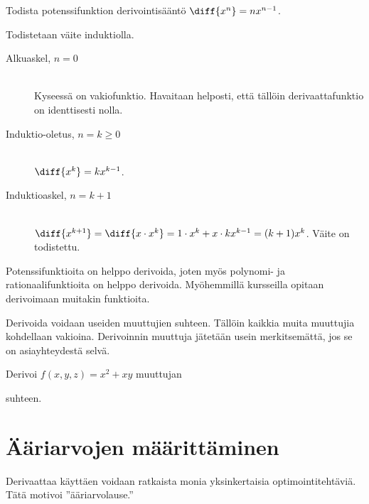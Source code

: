 \begin{esimerkki}
	Todista potenssifunktion derivointisääntö $\diff{x^n} = nx^{n-1}$.
	\begin{esimratk}
		Todistetaan väite induktiolla.
		\begin{description}
			\item[Alkuaskel, $n=0$] \hfill \\
			Kyseessä on vakiofunktio. Havaitaan helposti, että tällöin derivaattafunktio on identtisesti nolla.
			\item[Induktio-oletus, $n=k\geq0$] \hfill \\
			$\diff{x^k} = kx^{k-1}$.
			\item[Induktioaskel, $n=k+1$] \hfill \\
			$\diff{x^{k+1}} = \diff{x \cdot x^k} = 1 \cdot x^k + x \cdot kx^{k-1} = (k+1)x^k$. Väite on todistettu.
		\end{description}
	\end{esimratk}
\end{esimerkki}

Potenssifunktioita on helppo derivoida, joten myös polynomi- ja rationaalifunktioita on helppo derivoida.
Myöhemmillä kursseilla opitaan derivoimaan muitakin funktioita.

Derivoida voidaan useiden muuttujien suhteen. Tällöin kaikkia muita muuttujia kohdellaan vakioina.
Derivoinnin muuttuja jätetään usein merkitsemättä, jos se on asiayhteydestä selvä.

\begin{esimerkki}
	Derivoi $f(x,y,z)=x^2+xy$ muuttujan
	\begin{alakohdatrivi}
	\end{alakohdatrivi}
	suhteen. %
	\begin{esimvast}
		\begin{alakohdatrivi}
			\alakohta{$2x+y$}
			\alakohta{$x$}
			\alakohta{$0$}
		\end{alakohdatrivi}
	\end{esimvast}
\end{esimerkki}

\section{Ääriarvojen määrittäminen}

Derivaattaa käyttäen voidaan ratkaista monia yksinkertaisia optimointitehtäviä.
Tätä motivoi ''ääriarvolause.''

